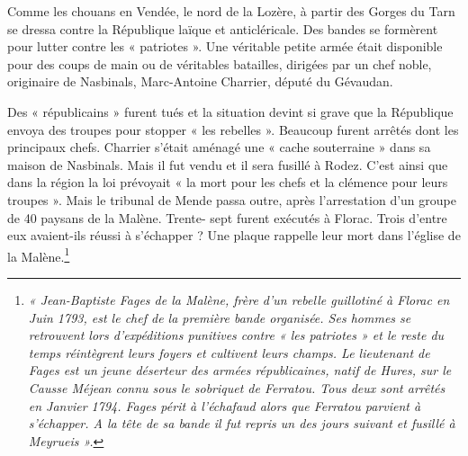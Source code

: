 {Comme les chouans en Vendée, le nord de la Lozère, à partir des Gorges du Tarn se dressa contre la République laïque et anticléricale. Des bandes se formèrent pour lutter contre les « patriotes ». Une véritable petite armée était disponible pour des coups de main ou de véritables batailles, dirigées par un chef noble, originaire de Nasbinals, Marc-Antoine Charrier, député du Gévaudan.

Des « républicains » furent tués et la situation devint si grave que la République envoya des troupes pour stopper « les rebelles ». Beaucoup furent arrêtés dont les principaux chefs.
Charrier s’était aménagé une « cache souterraine » dans sa maison de Nasbinals. Mais il fut vendu et il sera fusillé à Rodez. C’est ainsi que dans la région la loi prévoyait « la mort pour les chefs et la clémence pour leurs troupes ». Mais le tribunal de Mende passa outre, après l’arrestation d’un groupe de 40 paysans de la Malène. Trente-
sept furent exécutés à Florac. Trois d’entre eux avaient-ils réussi à s’échapper ? Une plaque rappelle leur mort dans l’église de la Malène.\footnote{\fontsize{8.0}{9.25}\selectfont
\textit{« Jean-Baptiste Fages de la Malène, frère d’un rebelle guillotiné à Florac en Juin 1793, est le chef de la première bande organisée.
Ses hommes se retrouvent lors d’expéditions punitives contre « les patriotes » et le reste du temps réintègrent leurs foyers et cultivent leurs champs.
Le lieutenant de Fages est un jeune déserteur des armées républicaines, natif de Hures, sur le Causse Méjean connu sous le sobriquet de Ferratou. Tous deux sont arrêtés en Janvier 1794. Fages périt à l’échafaud alors que Ferratou parvient à s’échapper. A la tête de sa bande il fut repris un des jours suivant et fusillé à Meyrueis ».}
}
}

\vspace{0.25em}




